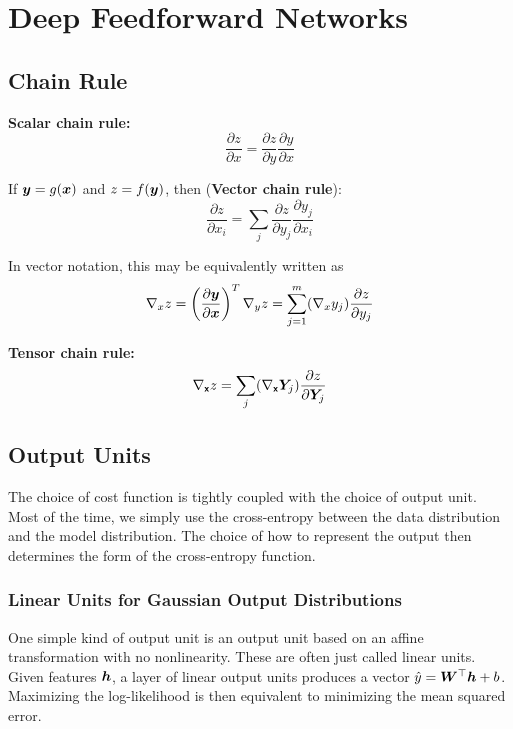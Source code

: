 \section{Deep Feedforward Networks}
\begin{multicols}{2}
	\subsection{Chain Rule}
	\textbf{Scalar chain rule:}
	\[ \frac{\partial z}{\partial x} = \frac{\partial z}{\partial y} \frac{\partial y}{\partial x} \]
	
	If $\bol{y}=g(\bol{x})$ and $z = f(\bol{y})$, then (\textbf{Vector chain rule}):
	\[ \frac{\partial z}{\partial x_i} = \sum_j \frac{\partial z}{\partial y_j} \frac{\partial y_j}{\partial x_i} \]
	
	In vector notation, this may be equivalently written as
	\[ \nabla_x z = \left( \frac{\partial \bol{y}}{\partial \bol{x}} \right)^T \nabla_y z
	= \sum_{j=1}^{m}(\nabla_xy_j) \frac{\partial z}{\partial y_j} \]
	
	\textbf{Tensor chain rule:}
	\[ \nabla_{\bm{\mathsf{x}}} z = \sum_j (\nabla_{\bm{\mathsf{x}}} \bol{Y}_j )\frac{\partial z}{\partial \bol{Y}_j} \]
	
	
	
	\subsection{Output Units}
	The choice of cost function is tightly coupled with the choice of output unit. Most	of the time, we simply use the cross-entropy between the data distribution and the	model distribution. The choice of how to represent the output then determines the form of the cross-entropy function.\\
	
	\subsubsection{Linear Units for Gaussian Output Distributions}
	One simple kind of output unit is an output unit based on an affine transformation with no nonlinearity. These are often just called linear units.
	Given features ${\bm{h}}$, a layer of linear output units produces a vector $\hat{y} = {\bm{W}} ^\top {\bm{h}} + b$.\\
	Maximizing the log-likelihood is then equivalent to minimizing the mean squared	error.
	
	

\end{multicols}
